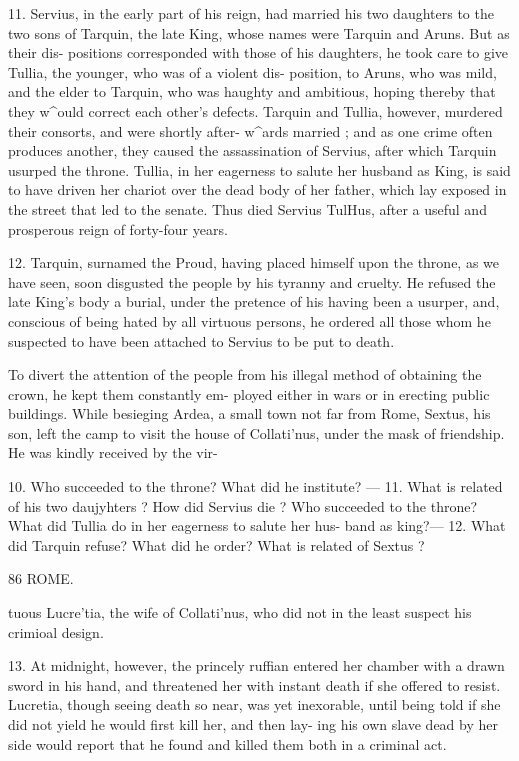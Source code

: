 \documentclass[openany,a4paper]{memoir}
\begin{document}
{11. Servius, in the early part of his reign, had married his 
two daughters to the two sons of Tarquin, the late King, 
whose names were Tarquin and Aruns. But as their dis- 
positions corresponded with those of his daughters, he took 
care to give Tullia, the younger, who was of a violent dis- 
position, to Aruns, who was mild, and the elder to Tarquin, 
who was haughty and ambitious, hoping thereby that they 
w^ould correct each other's defects. Tarquin and Tullia, 
however, murdered their consorts, and were shortly after- 
w^ards married ; and as one crime often produces another, 
they caused the assassination of Servius, after which Tarquin 
usurped the throne. Tullia, in her eagerness to salute her 
husband as King, is said to have driven her chariot over the 
dead body of her father, which lay exposed in the street that 
led to the senate. Thus died Servius TulHus, after a useful 
and prosperous reign of forty-four years. 

12. Tarquin, surnamed the Proud, having placed himself 
upon the throne, as we have seen, soon disgusted the people 
by his tyranny and cruelty. He refused the late King's 
body a burial, under the pretence of his having been a usurper, 
and, conscious of being hated by all virtuous persons, he 
ordered all those whom he suspected to have been attached 
to Servius to be put to death. 

To divert the attention of the people from his illegal 
method of obtaining the crown, he kept them constantly em- 
ployed either in wars or in erecting public buildings. While 
besieging Ardea, a small town not far from Rome, Sextus, 
his son, left the camp to visit the house of Collati'nus, under 
the mask of friendship. He was kindly received by the vir- 

10. Who succeeded to the throne? What did he institute? — 11. What 
is related of his two daujyhters ? How did Servius die ? Who succeeded 
to the throne? What did Tullia do in her eagerness to salute her hus- 
band as king?— 12. What did Tarquin refuse? What did he order? 
What is related of Sextus ? 



86 ROME. 

tuous Lucre'tia, the wife of Collati'nus, who did not in the 
least suspect his crimioal design. 

13. At midnight, however, the princely ruffian entered her 
chamber with a drawn sword in his hand, and threatened 
her with instant death if she offered to resist. Lucretia, 
though seeing death so near, was yet inexorable, until being 
told if she did not yield he would first kill her, and then lay- 
ing his own slave dead by her side would report that he 
found and killed them both in a criminal act. 

}
\end{document}
